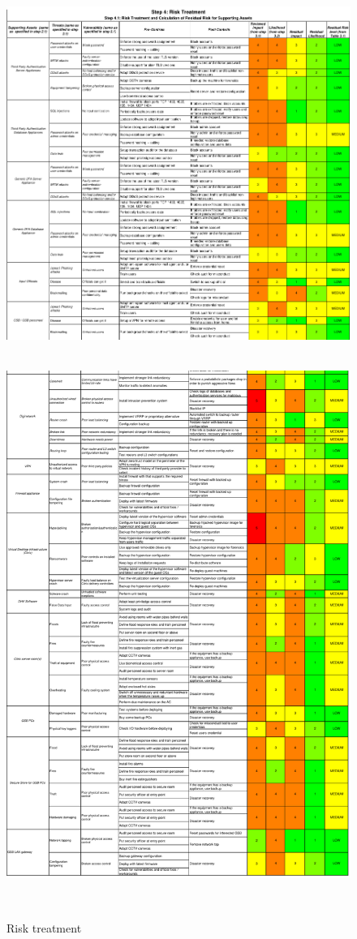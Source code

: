\begin{figure}%
    \centering
    \includegraphics[keepaspectratio,width=1\textwidth]{03-risk-analysis/005-RT/img/riskTreatCut1.pdf}~\label{fig:riskTreatCut1}
\end{figure}

\begin{figure}%
    \centering
    \includegraphics[keepaspectratio,width=1\textwidth]{03-risk-analysis/005-RT/img/riskTreatCut2.pdf}
    \caption{Risk treatment}~\label{fig:riskTreatCut2}
\end{figure}
